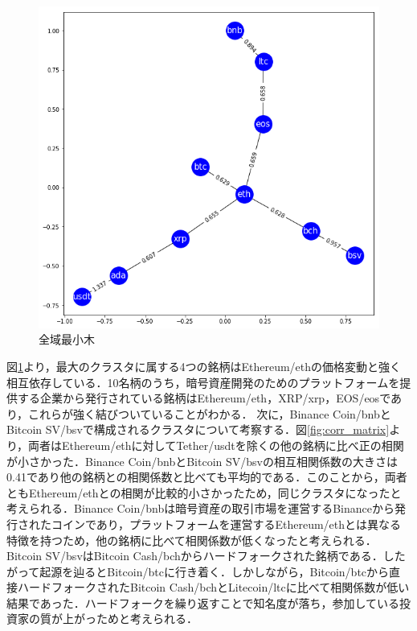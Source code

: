 \documentclass{jsarticle}
\begin{document}
	\begin{figure}
		\begin{center}
			\includegraphics[bb=0.000000 0.000000 613.139660 578.131686, width=0.5\linewidth]{img/mst.png}
			\caption{全域最小木}
			\label{fig:mst}
		\end{center}
	\end{figure}
	
	
	図\ref{fig:mst}より，最大のクラスタに属する4つの銘柄はEthereum/ethの価格変動と強く相互依存している．10名柄のうち，暗号資産開発のためのプラットフォームを提供する企業から発行されている銘柄はEthereum/eth\cite{eth}，XRP/xrp\cite{xrp}，EOS/eos\cite{eos}であり，これらが強く結びついていることがわかる．
	次に，Binance Coin/bnbとBitcoin SV/bsvで構成されるクラスタについて考察する．図\ref{fig:corr_matrix}より，両者はEthereum/ethに対してTether/usdtを除くの他の銘柄に比べ正の相関が小さかった．Binance Coin/bnbとBitcoin SV/bsvの相互相関係数の大きさは0.41であり他の銘柄との相関係数と比べても平均的である．このことから，両者ともEthereum/ethとの相関が比較的小さかったため，同じクラスタになったと考えられる．Binance Coin/bnbは暗号資産の取引市場を運営するBinanceから発行されたコインであり，プラットフォームを運営するEthereum/ethとは異なる特徴を持つため，他の銘柄に比べて相関係数が低くなったと考えられる．Bitcoin SV/bsvはBitcoin Cash/bchからハードフォークされた銘柄である\cite{bsv}．したがって起源を辿るとBitcoin/btcに行き着く．しかしながら，Bitcoin/btcから直接ハードフォークされたBitcoin Cash/bchとLitecoin/ltcに比べて相関係数が低い結果であった．ハードフォークを繰り返すことで知名度が落ち，参加している投資家の質が上がっためと考えられる．
	
\end{document}

